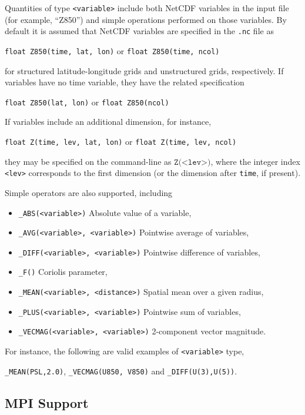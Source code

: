 \documentclass[gmdd, hvmath]{copernicus}
\begin{document}
Quantities of type \texttt{<variable>} include both NetCDF variables in the input file (for example, ``Z850'') and simple operations performed on those variables.  By default it is assumed that NetCDF variables are specified in the \texttt{.nc} file as
\begin{center}
\texttt{float Z850(time, lat, lon)} \quad or \quad \texttt{float Z850(time, ncol)}
\end{center} for structured latitude-longitude grids and unstructured grids, respectively.  If variables have no time variable, they have the related specification
\begin{center}
\texttt{float Z850(lat, lon)} \quad or \quad \texttt{float Z850(ncol)}
\end{center}  If variables include an additional dimension, for instance,
\begin{center}
\texttt{float Z(time, lev, lat, lon)} \quad or \quad \texttt{float Z(time, lev, ncol)}
\end{center} they may be specified on the command-line as $\texttt{Z(<lev>)}$, where the integer index \texttt{<lev>} corresponds to the first dimension (or the dimension after \texttt{time}, if present).  

Simple operators are also supported, including
\begin{itemize}
\item[] \texttt{\_ABS(<variable>)} Absolute value of a variable,
\item[] \texttt{\_AVG(<variable>, <variable>)} Pointwise average of variables,
\item[] \texttt{\_DIFF(<variable>, <variable>)} Pointwise difference of variables,
\item[] \texttt{\_F()}  Coriolis parameter,
\item[] \texttt{\_MEAN(<variable>, <distance>)} Spatial mean over a given radius,
\item[] \texttt{\_PLUS(<variable>, <variable>)} Pointwise sum of variables,
\item[] \texttt{\_VECMAG(<variable>, <variable>)} 2-component vector magnitude.
\end{itemize}  For instance, the following are valid examples of \texttt{<variable>} type,
\begin{center}
\texttt{\_MEAN(PSL,2.0)}, \quad \texttt{\_VECMAG(U850, V850)} \quad and \quad \texttt{\_DIFF(U(3),U(5))}.
\end{center}

\subsection{MPI Support} \label{sec:VariableSpecification}
\end{document}
